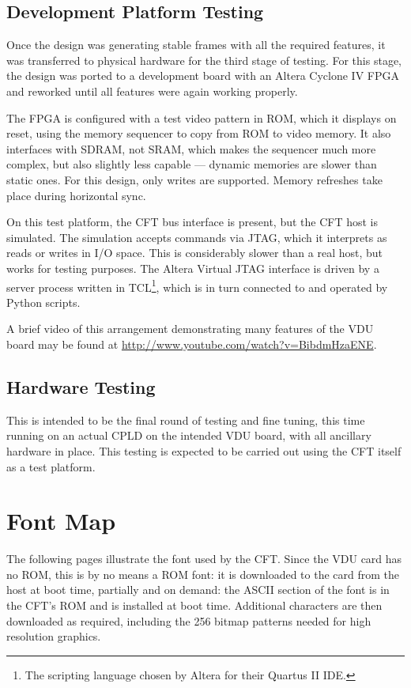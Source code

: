 \subsection{Development Platform Testing}

Once the design was generating stable frames with all the required features, it
was transferred to physical hardware for the third stage of testing. For this
stage, the design was ported to a development board with an Altera Cyclone IV
FPGA and reworked until all features were again working properly.

The FPGA is configured with a test video pattern in ROM, which it displays on
reset, using the memory sequencer to copy from ROM to video memory. It also
interfaces with \gls{SDRAM}, not \gls{SRAM}, which makes the sequencer much
more complex, but also slightly less capable — dynamic memories are slower than
static ones. For this design, only writes are supported. Memory refreshes take
place during horizontal sync.

On this test platform, the CFT bus interface is present, but the CFT host is
simulated. The simulation accepts commands via JTAG, which it interprets as
reads or writes in I/O space. This is considerably slower than a real host, but
works for testing purposes. The Altera Virtual JTAG interface is driven by a
server process written in TCL\footnote{The scripting language chosen by Altera
  for their Quartus II IDE.}, which is in turn connected to and operated by
Python scripts.

A brief video of this arrangement demonstrating many features of the VDU board
may be found at \url{http://www.youtube.com/watch?v=BibdmHzaENE}.

\subsection{Hardware Testing}

This is intended to be the final round of testing and fine tuning, this time
running on an actual CPLD on the intended VDU board, with all ancillary
hardware in place. This testing is expected to be carried out using the CFT
itself as a test platform.



\section{Font Map}

The following pages illustrate the font used by the CFT. Since the VDU card has
no ROM, this is by no means a ROM font: it is downloaded to the card from the
host at boot time, partially and on demand: the ASCII section of the font is in
the CFT's ROM and is installed at boot time. Additional characters are then
downloaded as required, including the 256 bitmap patterns needed for high
resolution graphics.

